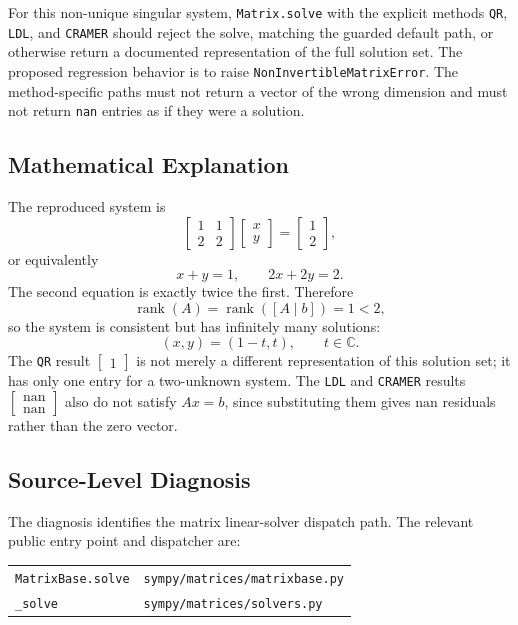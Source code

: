 \documentclass[11pt]{article}
\begin{document}
For this non-unique singular system, \texttt{Matrix.solve} with the explicit methods \texttt{QR}, \texttt{LDL}, and \texttt{CRAMER} should reject the solve, matching the guarded default path, or otherwise return a documented representation of the full solution set. The proposed regression behavior is to raise \texttt{NonInvertible}\allowbreak\texttt{MatrixError}. The method-specific paths must not return a vector of the wrong dimension and must not return \texttt{nan} entries as if they were a solution.

\subsection{Mathematical Explanation}

The reproduced system is
\[
\begin{bmatrix}
1 & 1\\
2 & 2
\end{bmatrix}
\begin{bmatrix}
x\\
y
\end{bmatrix}
=
\begin{bmatrix}
1\\
2
\end{bmatrix},
\]
or equivalently
\[
x+y=1,\qquad 2x+2y=2.
\]
The second equation is exactly twice the first. Therefore
\[
\operatorname{rank}(A)=\operatorname{rank}([A\mid b])=1<2,
\]
so the system is consistent but has infinitely many solutions:
\[
(x,y)=(1-t,t),\qquad t\in\mathbb{C}.
\]
The \texttt{QR} result \(\begin{bmatrix}1\end{bmatrix}\) is not merely a different representation of this solution set; it has only one entry for a two-unknown system. The \texttt{LDL} and \texttt{CRAMER} results \(\begin{bmatrix}\mathrm{nan}\\ \mathrm{nan}\end{bmatrix}\) also do not satisfy \(Ax=b\), since substituting them gives \(\mathrm{nan}\) residuals rather than the zero vector.

\subsection{Source-Level Diagnosis}

The diagnosis identifies the matrix linear-solver dispatch path. The relevant public entry point and dispatcher are:

\begin{center}
\begin{tabular}{@{}ll@{}}
\texttt{MatrixBase.solve} & \nolinkurl{sympy/matrices/matrixbase.py}\\
\texttt{\_solve} & \nolinkurl{sympy/matrices/solvers.py}
\end{tabular}
\end{center}
\end{document}
